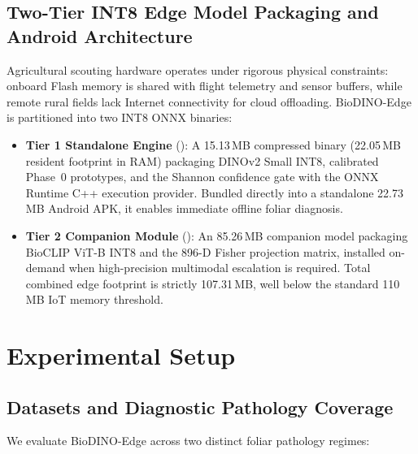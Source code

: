 \documentclass[a4paper,fleqn,nologo]{cas-dc}
\begin{document}
\subsection{Two-Tier INT8 Edge Model Packaging and Android Architecture}
\label{sec:packaging}
Agricultural scouting hardware operates under rigorous physical constraints: onboard Flash memory is shared with flight telemetry and sensor buffers, while remote rural fields lack Internet connectivity for cloud offloading. BioDINO-Edge is partitioned into two INT8 ONNX binaries:
\begin{itemize}
    \item \textbf{Tier 1 Standalone Engine} (): A 15.13\,MB compressed binary (22.05\,MB resident footprint in RAM) packaging DINOv2 Small INT8, calibrated Phase~0 prototypes, and the Shannon confidence gate with the ONNX Runtime C++ execution provider. Bundled directly into a standalone 22.73\,MB Android APK, it enables immediate offline foliar diagnosis.
    \item \textbf{Tier 2 Companion Module} (): An 85.26\,MB companion model packaging BioCLIP ViT-B INT8 and the 896-D Fisher projection matrix, installed on-demand when high-precision multimodal escalation is required. Total combined edge footprint is strictly 107.31\,MB, well below the standard 110\,MB IoT memory threshold.
\end{itemize}

\section{Experimental Setup}
\label{sec:experiments_setup}

\subsection{Datasets and Diagnostic Pathology Coverage}
\label{sec:datasets}
We evaluate BioDINO-Edge across two distinct foliar pathology regimes:
\end{document}
